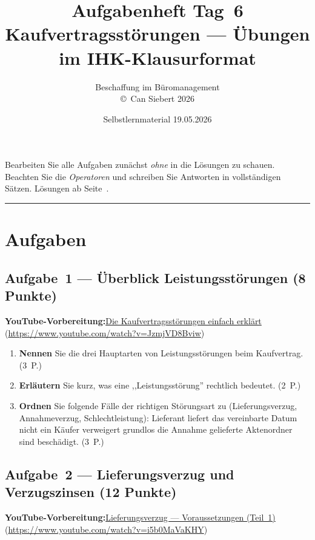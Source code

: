 \documentclass[11pt, a4paper]{article}
\title{\vspace*{-1.5cm}\Huge\bfseries\color{bfwPrimaryDark}Aufgabenheft Tag~6\\[0.4em]
  \large\color{bfwInkSoft}\textnormal{Kaufvertragsstörungen --- Übungen im IHK-Klausurformat}}
\author{\textsf{Beschaffung im Büromanagement}\\
\textsf{\small\copyright\ Can Siebert\,\textperiodcentered\,2026}}
\date{Selbstlernmaterial \textperiodcentered{} 19.05.2026}
\begin{document}
\maketitle
\thispagestyle{empty}

\begin{merksatz}[title={\bfseries So nutzen Sie dieses Aufgabenheft}]
Bearbeiten Sie alle Aufgaben zunächst \emph{ohne} in die Lösungen zu schauen.
Beachten Sie die \emph{Operatoren} und schreiben Sie Antworten in vollständigen Sätzen.
Lösungen ab Seite~\pageref{loesungen}.
\end{merksatz}

\tableofcontents
\vspace{1em}
\hrule

\section{Aufgaben}

\subsection*{Aufgabe~1 --- Überblick Leistungsstörungen (8 Punkte)}

\noindent\textbf{\color{bfwAccent}YouTube-Vorbereitung:}\enspace \href{https://www.youtube.com/watch?v=JzmjVD8Bviw}{Die Kaufvertragsstörungen einfach erklärt} (\url{https://www.youtube.com/watch?v=JzmjVD8Bviw})

\medskip
\begin{enumerate}[label=(\alph*)]
  \item \textbf{Nennen} Sie die drei Hauptarten von Leistungsstörungen beim Kaufvertrag. \hfill (3~P.)
  \item \textbf{Erläutern} Sie kurz, was eine ,,Leistungsstörung'' rechtlich bedeutet. \hfill (2~P.)
  \item \textbf{Ordnen} Sie folgende Fälle der richtigen Störungsart zu (Lieferungsverzug, Annahmeverzug, Schlechtleistung): Lieferant liefert das vereinbarte Datum nicht ein \textbar{} Käufer verweigert grundlos die Annahme \textbar{} gelieferte Aktenordner sind beschädigt. \hfill (3~P.)
\end{enumerate}

\subsection*{Aufgabe~2 --- Lieferungsverzug und Verzugszinsen (12 Punkte)}

\noindent\textbf{\color{bfwAccent}YouTube-Vorbereitung:}\enspace \href{https://www.youtube.com/watch?v=i5b0MaVaKHY}{Lieferungsverzug --- Voraussetzungen (Teil~1)} (\url{https://www.youtube.com/watch?v=i5b0MaVaKHY})
\end{document}
